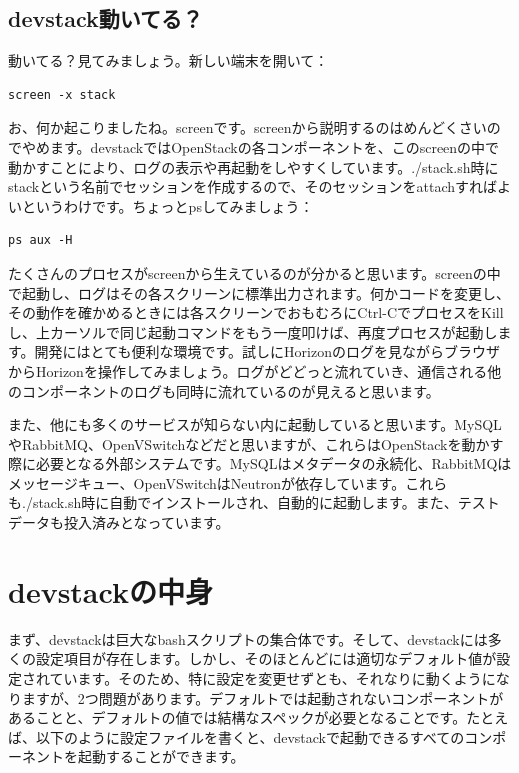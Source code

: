 \documentclass[9pt,b5paper,tombo,openany,dvipdfmx]{jsbook}
\begin{document}
\subsection{devstack動いてる？}

動いてる？見てみましょう。新しい端末を開いて：

\begin{lstlisting}
screen -x stack
\end{lstlisting}

お、何か起こりましたね。screenです。screenから説明するのはめんどくさいのでやめます。devstackではOpenStackの各コンポーネントを、このscreenの中で動かすことにより、ログの表示や再起動をしやすくしています。./stack.sh時にstackという名前でセッションを作成するので、そのセッションをattachすればよいというわけです。ちょっとpsしてみましょう：

\begin{lstlisting}
ps aux -H
\end{lstlisting}

たくさんのプロセスがscreenから生えているのが分かると思います。screenの中で起動し、ログはその各スクリーンに標準出力されます。何かコードを変更し、その動作を確かめるときには各スクリーンでおもむろにCtrl-CでプロセスをKillし、上カーソルで同じ起動コマンドをもう一度叩けば、再度プロセスが起動します。開発にはとても便利な環境です。試しにHorizonのログを見ながらブラウザからHorizonを操作してみましょう。ログがどどっと流れていき、通信される他のコンポーネントのログも同時に流れているのが見えると思います。

また、他にも多くのサービスが知らない内に起動していると思います。MySQLやRabbitMQ、OpenVSwitchなどだと思いますが、これらはOpenStackを動かす際に必要となる外部システムです。MySQLはメタデータの永続化、RabbitMQはメッセージキュー、OpenVSwitchはNeutronが依存しています。これらも./stack.sh時に自動でインストールされ、自動的に起動します。また、テストデータも投入済みとなっています。

\section{devstackの中身}

まず、devstackは巨大なbashスクリプトの集合体です。そして、devstackには多くの設定項目が存在します。しかし、そのほとんどには適切なデフォルト値が設定されています。そのため、特に設定を変更せずとも、それなりに動くようになりますが、2つ問題があります。デフォルトでは起動されないコンポーネントがあることと、デフォルトの値では結構なスペックが必要となることです。たとえば、以下のように設定ファイルを書くと、devstackで起動できるすべてのコンポーネントを起動することができます。
\end{document}
